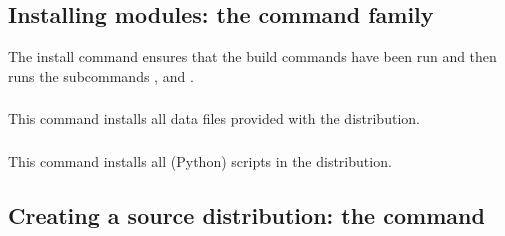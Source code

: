 \documentclass{howto}
\begin{document}


\subsection{Installing modules: the \protect{} command family}
\label{install-cmd}

The install command ensures that the build commands have been run and then
runs the subcommands ,
 and
.


\subsubsection{\protect{}}
\label{install-data-cmd}
This command installs all data files provided with the distribution.

\subsubsection{\protect{}}
\label{install-scripts-cmd}
This command installs all (Python) scripts in the distribution.




\subsection{Creating a source distribution: the
            \protect{} command}
\label{sdist-cmd}


\end{document}
